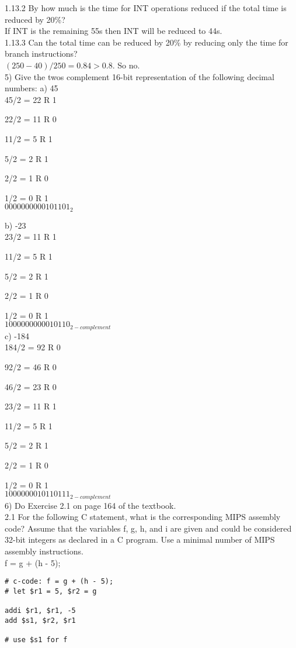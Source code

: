 1.13.2 By how much is the time for INT operations reduced if the
total time is reduced by 20\%? \\

If INT is the remaining 55s then INT will be reduced to 44s. \\

1.13.3 Can the total time can be reduced by 20\% by reducing only the time for branch instructions? \\

$(250 - 40)/250 = 0.84 > 0.8$. So no. \\

5) Give the twos complement 16-bit representation of the following decimal numbers:
a) 45 \\

45/2 = 22 R 1

22/2 = 11 R 0

11/2 = 5 R 1

5/2 = 2 R 1

2/2 = 1 R 0

1/2 = 0 R 1 \\

$0000000000101101_2$

b) -23 \\

23/2 = 11 R 1

11/2 = 5 R 1

5/2 = 2 R 1

2/2 = 1 R 0

1/2 = 0 R 1 \\

$1000000000010110_{2-complement}$ \\

c) -184 \\

184/2 = 92 R 0

92/2 = 46 R 0

46/2 = 23 R 0

23/2 = 11 R 1

11/2 = 5 R 1

5/2 = 2 R 1

2/2 = 1 R 0

1/2 = 0 R 1 \\

$1000000010110111_{2-complement}$ \\

6) Do Exercise 2.1 on page 164 of the textbook. \\

2.1 For the following C statement, what is the corresponding MIPS assembly code? Assume that the variables f, g, h, and i are given and could be considered 32-bit integers as declared in a C program. Use a minimal number of MIPS assembly instructions. \\

f = g + (h - 5); \\

\begin{verbatim}
# c-code: f = g + (h - 5);
# let $r1 = 5, $r2 = g

addi $r1, $r1, -5
add $s1, $r2, $r1

# use $s1 for f
\end{verbatim}


